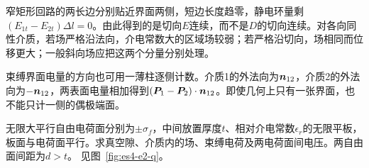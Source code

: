 窄矩形回路的两长边分别贴近界面两侧，短边长度趋零，静电环量剩$(E_{1t}-E_{2t})\Delta l=0$。由此得到的是切向$E$连续，而不是$D$的切向连续。对各向同性介质，若场严格沿法向，介电常数大的区域场较弱；若严格沿切向，场相同而位移更大；一般斜向场应把这两个分量分别处理。

束缚界面电量的方向也可用一薄柱逐侧计数。介质1的外法向为$\bm{n}_{12}$，介质2的外法向为$-\bm{n}_{12}$，两表面电量相加得到$(\bm{P}_1-\bm{P}_2)\cdot\bm{n}_{12}$。即使几何上只有一张界面，也不能只计一侧的偶极端面。

\begin{example}[无限介质平板中的法向场]\label{ex:es4-e2}
无限大平行自由电荷面分别为$\pm\sigma_f$，中间放置厚度$t$、相对介电常数$\epsilon_r$的无限平板，板面与电荷面平行。求真空隙、介质内的场、束缚电荷及两电荷面间电压。两自由面间距为$d>t$。 见图~\ref{fig:es4-e2-q}。
\end{example}

